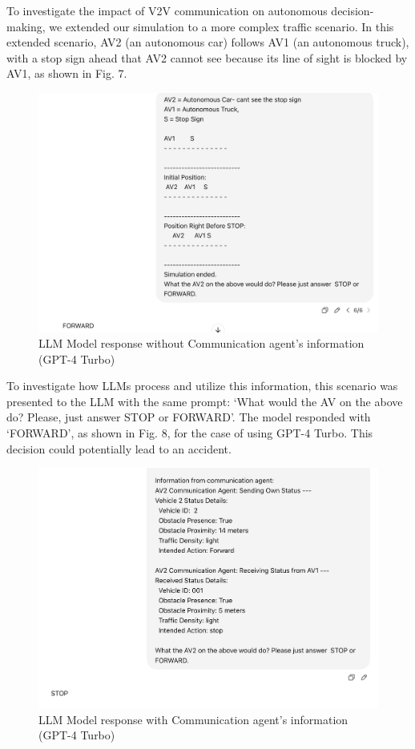 \documentclass[conference]{IEEEtran}
\begin{document}
To investigate the impact of V2V communication on autonomous decision-making, we extended our simulation to a more complex traffic scenario. In this extended scenario, AV2 (an autonomous car) follows AV1 (an autonomous truck), with a stop sign ahead that AV2 cannot see because its line of sight is blocked by AV1, as shown in Fig. 7.
 \begin{figure}[!ht]
     \centering
     \includegraphics[width=.9\linewidth]{Fig/Without_communicationafent.png}
     \caption{LLM Model response without Communication agent's information (GPT-4 Turbo)}
     \label{fig:enter-label}
 \end{figure}
To investigate how LLMs process and utilize this information, this scenario was presented to the LLM with the same prompt: `What would the AV on the above do? Please, just answer STOP or FORWARD'. The model responded with `FORWARD', as shown in Fig. 8, for the case of using GPT-4 Turbo. This decision could potentially lead to an accident. 
\begin{figure}[h]
     \centering
     \includegraphics[width=.9\linewidth]{Fig/withcommunicationagent.png}
     \caption{LLM Model response with Communication agent's information (GPT-4 Turbo)}
     \label{fig:enter-label}
\end{figure} 
\end{document}
